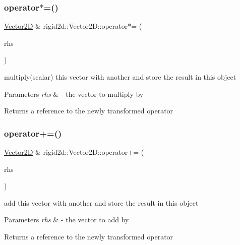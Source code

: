 \subsubsection{\texorpdfstring{operator$\ast$=()}{operator*=()}}
{\footnotesize\ttfamily \hyperlink{structrigid2d_1_1Vector2D}{Vector2D} \& rigid2d\+::\+Vector2\+D\+::operator$\ast$= (\begin{DoxyParamCaption}\item[{const \hyperlink{structrigid2d_1_1Vector2D}{Vector2D} \&}]{rhs }\end{DoxyParamCaption})}



multiply(scalar) this vector with another and store the result in this object 


\begin{DoxyParams}{Parameters}
{\em rhs} & -\/ the vector to multiply by \\
\hline
\end{DoxyParams}
\begin{DoxyReturn}{Returns}
a reference to the newly transformed operator 
\end{DoxyReturn}
\mbox{\label{structrigid2d_1_1Vector2D_aa17e3466179575f598b77153cbfea9e6}} 
\subsubsection{\texorpdfstring{operator+=()}{operator+=()}}
{\footnotesize\ttfamily \hyperlink{structrigid2d_1_1Vector2D}{Vector2D} \& rigid2d\+::\+Vector2\+D\+::operator+= (\begin{DoxyParamCaption}\item[{const \hyperlink{structrigid2d_1_1Vector2D}{Vector2D} \&}]{rhs }\end{DoxyParamCaption})}



add this vector with another and store the result in this object 


\begin{DoxyParams}{Parameters}
{\em rhs} & -\/ the vector to add by \\
\hline
\end{DoxyParams}
\begin{DoxyReturn}{Returns}
a reference to the newly transformed operator 
\end{DoxyReturn}
\mbox{\label{structrigid2d_1_1Vector2D_a8ef35cca4a51ecd76bee8b8dca5e3a63}} 
